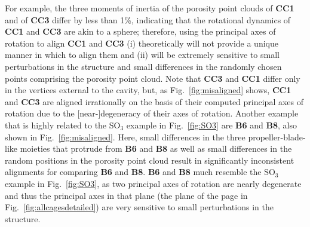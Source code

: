 \documentclass[journal=jacsat,manuscript=article]{achemso}
\begin{document}
For example, the three moments of inertia of the porosity point clouds of \textbf{CC1} and of \textbf{CC3} differ by less than 1\%, indicating that the rotational dynamics of \textbf{CC1} and \textbf{CC3} are akin to a sphere; therefore, using the principal axes of rotation to align \textbf{CC1} and \textbf{CC3} (i) theoretically will not provide a unique manner in which to align them and (ii) will be extremely sensitive to small perturbations in the structure and small differences in the randomly chosen points comprising the porosity point cloud. Note that \textbf{CC3} and \textbf{CC1} differ only in the vertices external to the cavity, but, as Fig.~\ref{fig:misaligned} shows, \textbf{CC1} and \textbf{CC3} are aligned irrationally on the basis of their computed principal axes of rotation due to the [near-]degeneracy of their axes of rotation. Another example that is highly related to the SO$_3$ example in Fig.~\ref{fig:SO3} are \textbf{B6} and \textbf{B8}, also shown in Fig.~\ref{fig:misaligned}. Here, small differences in the three propeller-blade-like moieties that protrude from \textbf{B6} and \textbf{B8} as well as small differences in the random positions in the porosity point cloud result in significantly inconsistent alignments for comparing \textbf{B6} and \textbf{B8}. \textbf{B6} and \textbf{B8} much resemble the SO$_3$ example in Fig.~\ref{fig:SO3}, as two principal axes of rotation are nearly degenerate and thus the principal axes in that plane (the plane of the page in Fig.~\ref{fig:allcagesdetailed}) are very sensitive to small perturbations in the structure.
\end{document}

